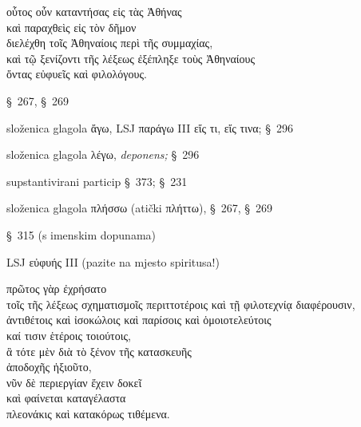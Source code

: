 

{\large
\begin{greek}
\noindent οὗτος οὖν καταντήσας εἰς τὰς Ἀθήνας\\
\tabto{2em} καὶ παραχθεὶς εἰς τὸν δῆμον\\
διελέχθη τοῖς Ἀθηναίοις περὶ τῆς συμμαχίας, \\
καὶ τῷ ξενίζοντι τῆς λέξεως ἐξέπληξε τοὺς Ἀθηναίους \\
\tabto{2em} ὄντας εὐφυεῖς καὶ φιλολόγους.\\

\end{greek}
}

\begin{description}[noitemsep]
\item[καταντήσας] §~267, §~269 
\item[παραχθεὶς] složenica glagola ἄγω, LSJ παράγω III εἴς τι, εἴς τινα; §~296
\item[διελέχθη] složenica glagola λέγω, \textit{deponens;} §~296
\item[τῷ ξενίζοντι] supstantivirani particip §~373; §~231
\item[ἐξέπληξε] složenica glagola πλήσσω (atički πλήττω), §~267, §~269
\item[ὄντας] §~315 (s imenskim dopunama)
\item[εὐφυεῖς] LSJ εὐφυής III (pazite na mjesto spiritusa!)

\end{description}



{\large
\begin{greek}
\noindent πρῶτος γὰρ ἐχρήσατο \\
\tabto{2em} τοῖς τῆς λέξεως σχηματισμοῖς περιττοτέροις καὶ τῇ φιλοτεχνίᾳ διαφέρουσιν, \\
\tabto{2em} ἀντιθέτοις καὶ ἰσοκώλοις καὶ παρίσοις καὶ ὁμοιοτελεύτοις \\
\tabto{2em} καί τισιν ἑτέροις τοιούτοις, \\
\tabto{4em} ἃ τότε μὲν διὰ τὸ ξένον τῆς κατασκευῆς \\
\tabto{6em} ἀποδοχῆς ἠξιοῦτο, \\
\tabto{4em} νῦν δὲ περιεργίαν ἔχειν δοκεῖ \\
\tabto{4em} καὶ φαίνεται καταγέλαστα \\
\tabto{6em} πλεονάκις καὶ κατακόρως τιθέμενα.\\

\end{greek}
}

